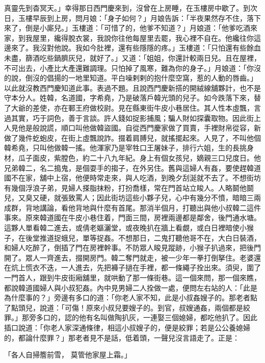 真靈先到杳冥天。」幸得那日西門慶來到，沒曾在上房睡，在玉樓房中歇了。到次日，玉樓早辰到上房，問月娘：「身子如何？」月娘告訴：「半夜果然存不住，落下來了，倒是小廝兒。」玉樓道：「可惜了的，他爹不知道？」月娘道：「他爹吃酒來家，到我屋里，纔得脫衣裳，我說你往他每屋里去罷，我心裡不自在。他纔往你這邊來了。我沒對他說。我如今肚裡，還有些隱隱的疼。」玉樓道：「只怕還有些餘血未盡，篩酒吃些鍋臍灰兒，就好了。」又道：「姐姐，你還計較兩日兒。且在屋裡，不可出去，小產比大產還難調理。只怕掉了風寒，難為你的身子。」月娘道：「你沒的說，倒沒的倡揚的一地里知道。平白噪剌剌的抱什麼空窩，惹的人動的唇齒。」以此就沒教西門慶知道此事。表過不題。且說西門慶新搭的開絨線舖夥計，也不是守本分人。姓韓，名道國，字希堯，乃是破落戶韓光頭的兒子。如今跌落下來，替了大爺的差使，亦在鄆王府做校尉。見在縣東街牛皮小巷居住。其人性本虛飄，言過其實，巧于詞色，善于言談。許人錢如捉影捕風；騙人財如探囊取物。因此街上人見他是般說謊，順口叫他做韓盜國。自從西門慶家做了買賣，手裡財帛從容，新做了幾件虼蚫皮，在街上虛飄說詐。掇着肩膊兒，就搖擺起來。人見了，不叫他個韓希堯，只叫他做韓一搖。他渾家乃是宰牲口王屠妹子，排行六姐，生的長挑身材，瓜子面皮，紫膛色，約二十八九年紀。身上有個女孩兒，嫡親三口兒度日。他兄弟韓二，名二搗鬼，是個耍手的搊子，在外另住。舊與這婦人有姦，要使趕韓道國不在家，舖中上宿，他便時常走來，與人吃酒，到晚夕刮涎就不去了。不想街坊有幾個浮浪子弟，見婦人搽脂抹粉，打扮喬樣，常在門首站立睃人。人略鬬他鬬兒，又臭又硬，就張致罵人；因此街坊這些小夥子兒，心中有幾分不憤，暗暗三兩成群，背地講論，看他背地與什麼有首尾。那消半個月，打聽出與他小叔韓二這件事來。原來韓道國在牛皮小巷住着，門面三間，房裡兩邊都是鄰舍，後門通水塘。這夥人單看韓二進去，或倩老嫗灑堂，或夜晚扒在牆上看覷，或白日裡暗使小猴子，在後堂推道捉蛾兒，單等捉姦。不想那日，二鬼打聽他哥不在，大白日裝酒，和婦人吃醉了，倒插了門在房裡幹事。不防眾人睃見蹤跡，小猴子扒過來，把後門開了。眾人一齊進去，掇開房門。韓二奪門就走，被一少年一拳打倒拏住。老婆還在炕上慌衣不迭，一人進去，先把褲子撾在手裡，都一條繩子拴出來。須臾，圍了一門首人，跟到牛皮街廂舖里，就哄動了那一條街巷。這一個來問，那一個來瞧，都說韓道國婦人與小叔犯姦。內中見男婦二人拴做一處，便問左右站的人：「此是為什麼事的？」旁邊有多口的道：「你老人家不知，此是小叔姦嫂子的。那老者點了點頭兒，說道：「可傷！原來小叔兒要嫂子的。到官，叔嫂通姦，兩個都是絞罪。」那旁多口的，認的他有名叫做陶扒灰，一連娶三個媳婦，都吃他扒了。因此插口說道：「你老人家深通條律，相這小叔嫂子的，便是絞罪；若是公公養媳婦的，都論什麼罪？」那老者見不是話，低着頭，一聲兒沒言語走了。正是：

「各人自掃簷前雪，  莫管他家屋上霜。」

